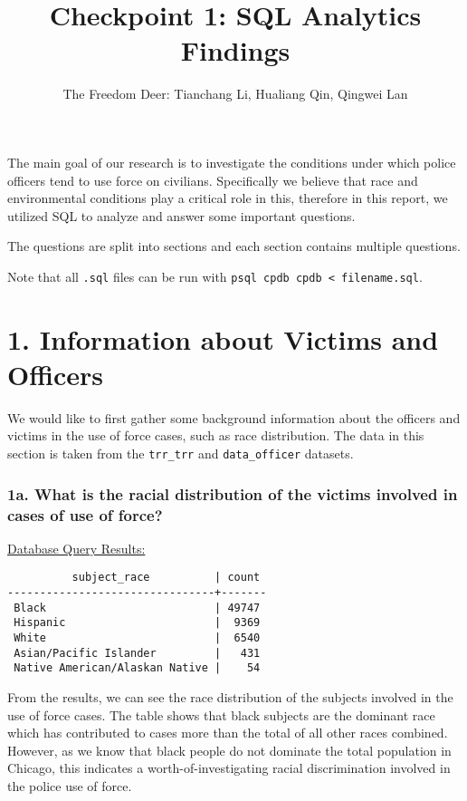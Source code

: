 \documentclass[10pt]{article}
\title{Checkpoint 1: SQL Analytics Findings}
\author{The Freedom Deer: Tianchang Li, Hualiang Qin, Qingwei Lan}
\begin{document}
\maketitle

The main goal of our research is to investigate the conditions under which police officers tend to use force on civilians. Specifically we believe that race and environmental conditions play a critical role in this, therefore in this report, we utilized SQL to analyze and answer some important questions.

The questions are split into sections and each section contains multiple questions.

Note that all \texttt{.sql} files can be run with \texttt{psql cpdb cpdb < filename.sql}.

\section*{1. Information about Victims and Officers}

We would like to first gather some background information about the officers and victims in the use of force cases, such as race distribution. The data in this section is taken from the \texttt{trr\_trr} and \texttt{data\_officer} datasets.

\subsubsection*{1a. What is the racial distribution of the victims involved in cases of use of force?}

\underline{Database Query Results:}

\begin{verbatim}
          subject_race          | count
--------------------------------+-------
 Black                          | 49747
 Hispanic                       |  9369
 White                          |  6540
 Asian/Pacific Islander         |   431
 Native American/Alaskan Native |    54
\end{verbatim}

From the results, we can see the race distribution of the subjects involved in the use of force cases. The table shows that black subjects are the dominant race which has contributed to cases more than the total of all other races combined. However, as we know that black people do not dominate the total population in Chicago, this indicates a worth-of-investigating racial discrimination involved in the police use of force.
\end{document}

